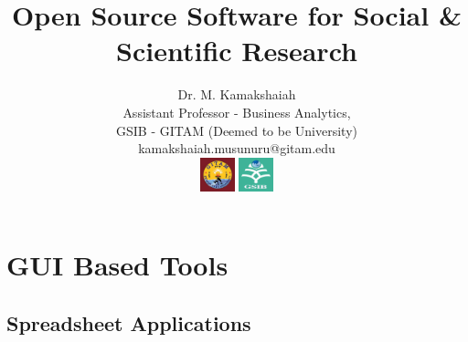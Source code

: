 \documentclass{beamer}
\title{Open Source Software for Social \& Scientific Research}
\author{Dr. M. Kamakshaiah \\ Assistant Professor - Business Analytics, \\ GSIB - GITAM \tiny{(Deemed to be University)} \\ \small{kamakshaiah.musunuru@gitam.edu} \\ \vspace{2cm} \includegraphics[height=1cm, width=1cm]{gitam_logo} \includegraphics[height=1cm, width=1cm]{gsib_logo}}
\date{}
\begin{document}
\maketitle
\tableofcontents

\section{GUI Based Tools}

\subsection{Spreadsheet Applications}
\end{document}
